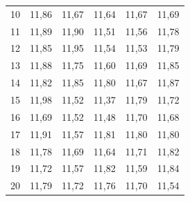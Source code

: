 \documentclass[12pt, a4paper, brazil]{article}
\begin{document}
\begin{table}[H]
\begin{tabular}{c c c c c c}
		10            & 11,86                     & 11,67                     & 11,64                     & 11,67                       & 11,69                     \\
		11            & 11,89                     & 11,90                     & 11,51                     & 11,56                       & 11,78                     \\
		12            & 11,85                     & 11,95                     & 11,54                     & 11,53                       & 11,79                     \\
		13            & 11,88                     & 11,75                     & 11,60                     & 11,69                       & 11,85                     \\
		14            & 11,82                     & 11,85                     & 11,80                     & 11,67                       & 11,87                     \\
		15            & 11,98                     & 11,52                     & 11,37                     & 11,79                       & 11,72                     \\
		16            & 11,69                     & 11,52                     & 11,48                     & 11,70                       & 11,68                     \\
		17            & 11,91                     & 11,57                     & 11,81                     & 11,80                       & 11,80                     \\
		18            & 11,78                     & 11,69                     & 11,64                     & 11,71                       & 11,82                     \\
		19            & 11,72                     & 11,57                     & 11,82                     & 11,59                       & 11,84                     \\
		20            & 11,79                     & 11,72                     & 11,76                     & 11,70                       & 11,54                     \\
		\hline
	\end{tabular}
	\label{tab:medições_cm}
\end{table}
\end{document}
